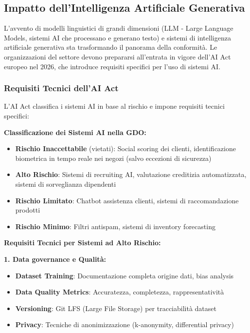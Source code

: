 \subsection{Impatto dell'Intelligenza Artificiale Generativa}

L'avvento di modelli linguistici di grandi dimensioni (LLM - Large Language Models, sistemi AI che processano e generano testo) e sistemi di intelligenza artificiale generativa sta trasformando il panorama della conformità. Le organizzazioni del settore devono prepararsi all'entrata in vigore dell'AI Act europeo nel 2026, che introduce requisiti specifici per l'uso di sistemi AI.

\subsubsection{Requisiti Tecnici dell'AI Act}

L'AI Act classifica i sistemi AI in base al rischio e impone requisiti tecnici specifici:

\textbf{Classificazione dei Sistemi AI nella GDO:}
\begin{itemize}
    \item \textbf{Rischio Inaccettabile} (vietati): Social scoring dei clienti, identificazione biometrica in tempo reale nei negozi (salvo eccezioni di sicurezza)
    \item \textbf{Alto Rischio}: Sistemi di recruiting AI, valutazione creditizia automatizzata, sistemi di sorveglianza dipendenti
    \item \textbf{Rischio Limitato}: Chatbot assistenza clienti, sistemi di raccomandazione prodotti
    \item \textbf{Rischio Minimo}: Filtri antispam, sistemi di inventory forecasting
\end{itemize}

\textbf{Requisiti Tecnici per Sistemi ad Alto Rischio:}

\textbf{1. Data \gls{governance} e Qualità:}
\begin{itemize}
    \item \textbf{Dataset Training}: Documentazione completa origine dati, bias analysis
    \item \textbf{Data Quality Metrics}: Accuratezza, completezza, rappresentatività
    \item \textbf{Versioning}: Git LFS (Large File Storage) per tracciabilità dataset
    \item \textbf{Privacy}: Tecniche di anonimizzazione (k-anonymity, differential privacy)
\end{itemize}

